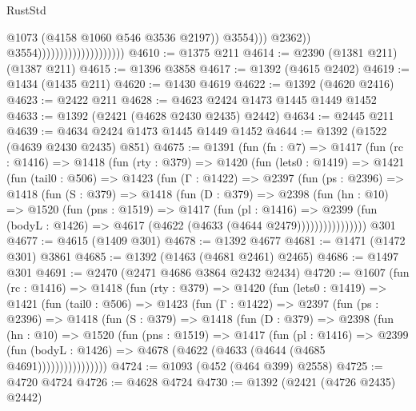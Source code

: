 \begin{lexlean}{RustStd}
\begin{coremodule}
                                                        @1073
                                                        (@4158 @1060 @546 @3536 @2197))
                                                      @3554)))
                                                @2362))
                                            @3554))))))))))))))))))))
@4610 := @1375 @211
@4614 := @2390 (@1381 @211) (@1387 @211)
@4615 := @1396 @3858
@4617 := @1392 (@4615 @2402)
@4619 := @1434 (@1435 @211)
@4620 := @1430 @4619
@4622 := @1392 (@4620 @2416)
@4623 := @2422 @211
@4628 := @4623 @2424 @1473 @1445 @1449 @1452
@4633 := @1392 (@2421 (@4628 @2430 @2435) @2442)
@4634 := @2445 @211
@4639 := @4634 @2424 @1473 @1445 @1449 @1452
@4644 := @1392 (@1522 (@4639 @2430 @2435) @851)
@4675 := @1391
    (fun (fn : @7) =>
    @1417
      (fun (rc : @1416) =>
      @1418
        (fun (rty : @379) =>
        @1420
          (fun (lets0 : @1419) =>
          @1421
            (fun (tail0 : @506) =>
            @1423
              (fun (Γ : @1422) =>
              @2397
                (fun (ps : @2396) =>
                @1418
                  (fun (S : @379) =>
                  @1418
                    (fun (D : @379) =>
                    @2398
                      (fun (hn : @10) =>
                      @1520
                        (fun (pns : @1519) =>
                        @1417
                          (fun (pl : @1416) =>
                          @2399
                            (fun (bodyL : @1426) => @4617 (@4622 (@4633 (@4644 @2479))))))))))))))))
    @301
@4677 := @4615 (@1409 @301)
@4678 := @1392 @4677
@4681 := @1471 (@1472 @301) @3861
@4685 := @1392 (@1463 (@4681 @2461) @2465)
@4686 := @1497 @301
@4691 := @2470 (@2471 @4686 @3864 @2432 @2434)
@4720 := @1607
    (fun (rc : @1416) =>
    @1418
      (fun (rty : @379) =>
      @1420
        (fun (lets0 : @1419) =>
        @1421
          (fun (tail0 : @506) =>
          @1423
            (fun (Γ : @1422) =>
            @2397
              (fun (ps : @2396) =>
              @1418
                (fun (S : @379) =>
                @1418
                  (fun (D : @379) =>
                  @2398
                    (fun (hn : @10) =>
                    @1520
                      (fun (pns : @1519) =>
                      @1417
                        (fun (pl : @1416) =>
                        @2399
                          (fun (bodyL : @1426) =>
                          @4678 (@4622 (@4633 (@4644 (@4685 @4691))))))))))))))))
@4724 := @1093 (@452 (@464 @399) @2558)
@4725 := @4720 @4724
@4726 := @4628 @4724
@4730 := @1392 (@2421 (@4726 @2435) @2442)

\end{coremodule}
\end{lexlean}
